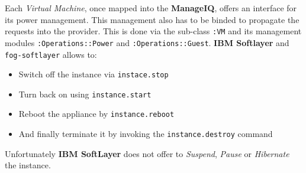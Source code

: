 Each \emph{Virtual Machine}, once mapped into the \textbf{ManageIQ}, offers an interface for its power management. This management also has to be binded to propagate the requests into the provider. This is done via the sub-class \verb|:VM| and its management modules \verb|:Operations::Power| and \verb|:Operations::Guest|. \textbf{IBM Softlayer} and \texttt{fog-softlayer} allows to:

\begin{itemize}
	\item Switch off the instance via \verb|instace.stop|
	\item Turn back on using \verb|instance.start|
	\item Reboot the appliance by \verb|instance.reboot|
	\item And finally terminate it by invoking the \verb|instance.destroy| command
\end{itemize}

Unfortunately \textbf{IBM SoftLayer} does not offer to \emph{Suspend}, \emph{Pause} or \emph{Hibernate} the instance.

